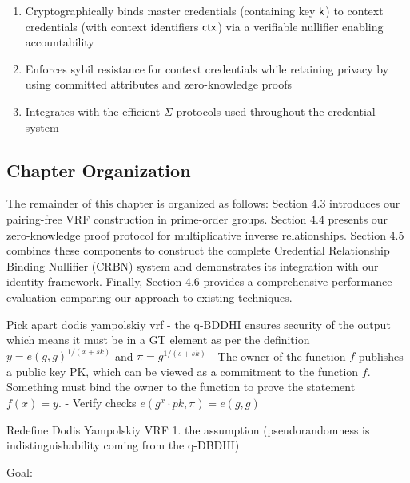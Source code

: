 \begin{enumerate}
    \item Cryptographically binds master credentials (containing key $\mathsf{k}$) to context credentials (with context identifiers $\mathsf{ctx}$) via a verifiable nullifier enabling accountability
    
    \item Enforces sybil resistance for context credentials while retaining privacy by using committed attributes and zero-knowledge proofs
    
    \item Integrates with the efficient $\Sigma$-protocols used throughout the credential system
\end{enumerate}

\subsection*{Chapter Organization}
The remainder of this chapter is organized as follows: Section 4.3 introduces our pairing-free VRF construction in prime-order groups. Section 4.4 presents our zero-knowledge proof protocol for multiplicative inverse relationships. Section 4.5 combines these components to construct the complete Credential Relationship Binding Nullifier (CRBN) system and demonstrates its integration with our identity framework. Finally, Section 4.6 provides a comprehensive performance evaluation comparing our approach to existing techniques.







Pick apart dodis yampolskiy vrf
- the q-BDDHI ensures security of the output which means it must be in a GT element as per the definition $y = e(g,g)^{1/(x+sk)}$ and $\pi = g^{1/(s+sk)}$
- The owner of the function $f$ publishes a public key PK, which can be viewed as a commitment to the function $f$. Something must bind the owner to the function to prove the statement $f(x) = y$. 
- Verify checks $e(g^x \cdot pk, \pi) = e(g,g)$










Redefine Dodis Yampolskiy VRF
1. the assumption (pseudorandomness is indistinguishability coming from the q-DBDHI)



Goal: 

